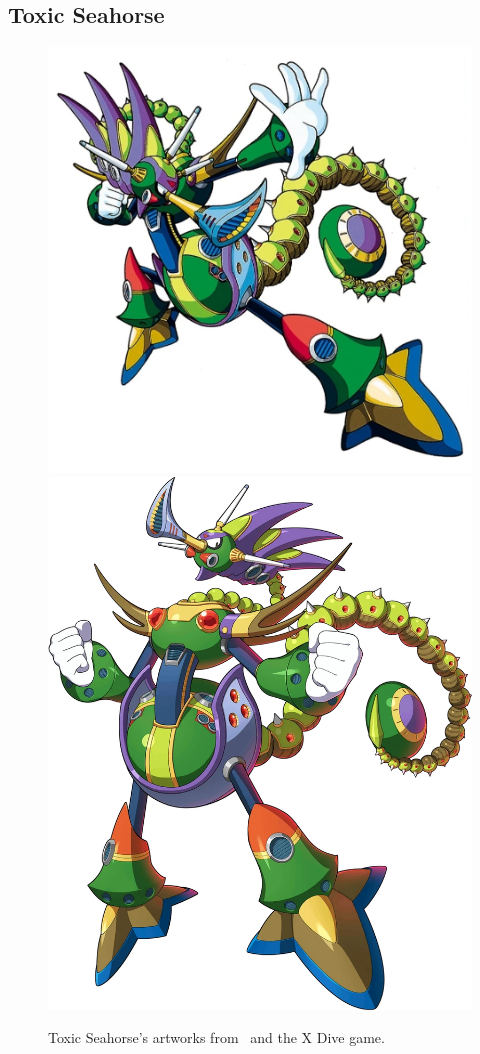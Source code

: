 \subsection{Toxic Seahorse}\label{boss:Toxic_seahorse}
\begin{figure}[htp]
	\centering
	\includegraphics[height=\portraitsize]{figures/X3/Toxic_seahorse/toxicseahorse.png}
	\includegraphics[height=\portraitsize]{figures/X3/Toxic_seahorse/XToxic_Seahorse.png}
	\caption{Toxic Seahorse's artworks from~\cite{book:MMX_Complete_art} and the X Dive game.}
\end{figure}

